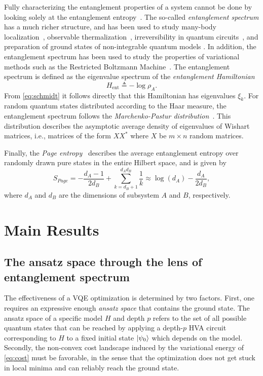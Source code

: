 \documentclass[
 aps,
 pra,
 showpacs,
 showkeys,
 superscriptaddress,
 reprint,%
twocolumn,
]{revtex4-1}
\begin{document}
Fully characterizing the entanglement properties of a system cannot be done by looking solely at the entanglement entropy~\cite{Li2008entspec, Yang2015mpdist, Shaffer2014irrcirc}. The so-called \emph{entanglement spectrum} has a much richer structure, and has been used to study many-body localization~\cite{Yang2015mpdist}, observable thermalization~\cite{Geraedts2016thermalize}, irreversibility in quantum circuits~\cite{Shaffer2014irrcirc}, and preparation of
ground states of non-integrable quantum models \cite{matos2020quantifying}. In addition, the entanglement spectrum has been used to study the properties of variational methods such as the Restricted Boltzmann Machine~\cite{Deng2017}. The entanglement spectrum is defined as the eigenvalue spectrum of the \emph{entanglement Hamiltonian}
\begin{equation}
    H_{\text{ent}} \triangleq - \log \rho_{A}. \label{eq:ent_spect}
\end{equation}
From \cref{eq:schmidt} it follows directly that this Hamiltonian has eigenvalues $\xi_k$. For random quantum states distributed according to the Haar measure, the entanglement spectrum follows the \emph{Marchenko-Pastur distribution}~\cite{Znidaric2006randomvec, marenko_mp_1967}. This distribution describes the asymptotic average density of eigenvalues of Wishart matrices, i.e., matrices of the form $XX^*$ where $X$ be $m \times n$ random matrices. 

Finally, the \emph{Page entropy}~\cite{page1993} describes the average entanglement entropy over randomly drawn pure states in the entire Hilbert space, and is given by
\begin{equation}
    S_{Page} = - \frac{d_A - 1}{2d_B} + \sum_{k=d_B + 1}^{d_Ad_B} \frac{1}{k}\approx \log(d_A) - \frac{d_A}{2d_B},
\end{equation}
where $d_A$ and $d_B$ are the dimensions of subsystem $A$ and $B$, respectively.



\section{Main Results}\label{sec:main}

\subsection{The ansatz space through the lens of entanglement spectrum}
\label{sec:ansatz-space}

The effectiveness of a VQE optimization is determined by two factors. First, one requires an expressive enough \emph{ansatz space} that contains the ground state. The ansatz space of a specific model $H$ and depth $p$ refers to the set of all possible quantum states that can be reached by applying a depth-$p$ HVA circuit corresponding to $H$ to a fixed initial state $\ket{\psi_0}$ which depends on the model. Secondly, the non-convex cost landscape induced by the variational energy of \cref{eq:cost} must be favorable, in the sense that the optimization does not get stuck in local minima and can reliably reach the ground state. 
\end{document}
